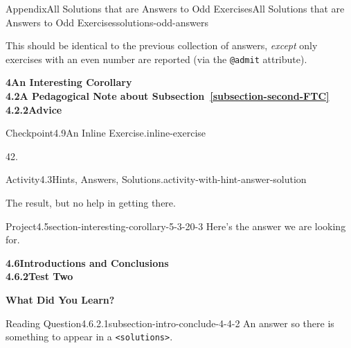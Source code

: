 \documentclass[twoside,10pt,]{article}
\newcommand{\xreffont}{\relax}
\newcommand{\mono}[1]{\texttt{#1}}
\numberwithin{equation}{section}
\begin{document}
%
%
\typeout{************************************************}
\typeout{************************************************}
%
\begin{solutions-section}{Appendix}{All Solutions that are Answers to Odd Exercises}{}{All Solutions that are Answers to Odd Exercises}{}{}{solutions-odd-answers}
%
\begin{introduction}{}%
This should be identical to the previous collection of answers, \emph{except} only exercises with an even number are reported (via the \mono{@admit} attribute).%
\end{introduction}%
\par\medskip
\noindent\textbf{\large{}4\space\textperiodcentered\space{}An Interesting Corollary\\
4.2\space\textperiodcentered\space{}A Pedagogical Note about Subsection~{\xreffont\ref*{subsection-second-FTC}}\\
4.2.2\space\textperiodcentered\space{}Advice}
\begin{inlinesolution}{Checkpoint}{4.9}{An Inline Exercise.}{inline-exercise}%
\par\smallskip%
\noindent\hypertarget{inline-exercise-4-back}{}42.%
\end{inlinesolution}%
\begin{activitysolution}{Activity}{4.3}{Hints, Answers, Solutions.}{activity-with-hint-answer-solution}%
\par\smallskip%
\noindent\hypertarget{activity-with-hint-answer-solution-5-back}{}The result, but no help in getting there.%
\end{activitysolution}%
\begin{projectsolution}{Project}{4.5}{}{section-interesting-corollary-5-3-20-3}%
\noindent\hypertarget{section-interesting-corollary-5-3-20-3-2-back}{}Here's the answer we are looking for.%
\end{projectsolution}%
\par\medskip
\noindent\textbf{\large{}4.6\space\textperiodcentered\space{}Introductions and Conclusions\\
4.6.2\space\textperiodcentered\space{}Test Two}
\par\medskip
\noindent\textbf{\normalsize{}\textperiodcentered\space{}What Did You Learn?}
\begin{divisionsolution}{Reading Question}{4.6.2.1}{}{subsection-intro-conclude-4-4-2}%
\noindent\hypertarget{subsection-intro-conclude-4-4-2-2-back}{}An answer so there is something to appear in a \mono{<solutions>}.%

\end{divisionsolution}
\end{solutions-section}
\end{document}
